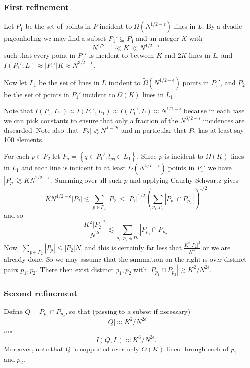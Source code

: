 \documentclass[12pt]{article}
\begin{document}
\subsubsection{First refinement}

Let $P_1$  be the set of points in $P$ incident to $\Omega\left(N^{1/2-\epsilon}\right)$ lines in $L$.
By a dyadic pigeonholing we may find a subset $P_1'\subseteq P_1$ and an integer $K$ with $$N^{1/2- \epsilon}\ll K \ll N^{1/2+\epsilon}$$ such that every point in $P_1'$ is incident to between $K$ and $2K$ lines in $L$, and $I(P_1',L)\approx|P_1'|K \approx N^{3/2-\epsilon}$. 

Now let $L_1$ be the set of lines in $L$ incident to $\widetilde{\Omega}\left(N^{1/2-\epsilon}\right)$ points in $P_1'$, and
 $P_2$ be the set of points in $P_1'$ incident to $\widetilde{\Omega}\left(K\right)$ lines in $L_1$.

Note that $I(P_2,L_1)\approx I(P_1',L_1)\approx I(P_1',L)\approx N^{3/2-\epsilon}$ because in each case we can pick constants to ensure that only a fraction of the $N^{3/2-\epsilon}$ incidences are discarded. Note also that $|P_2|\gtrsim N^{1-2\epsilon}$ and in particular that $P_2$ has at least say 100 elements.

For each $p \in P_2$ let $P_p=\left\{q \in P_1':l_{pq}\in L_1\right\}$. Since $p$ is incident to $\widetilde{\Omega}(K)$ lines in $L_1$ and each line is incident to at least $\widetilde{\Omega}(N^{1/2-\epsilon})$ points in $P_1'$ we have $|P_p|\gtrsim K N^{1/2-\epsilon}$. Summing over all such $p$ and applying Cauchy-Schwartz gives
\begin{equation}\label{eq:CS}
K N^{1/2-\epsilon}|P_2|\lesssim \sum_{p \in P_2}|P_2|
\leq |P_1|^{1/2}\left(\sum_{p_1,p_2}\left|P_{p_1}\cap P_{p_2}\right|\right)^{1/2}
\end{equation}
and so 
$$\frac{K^2 |P_2|^2}{N^{2\epsilon}}  \lesssim \sum_{p_1,p_2 \in P_2}\left|P_{p_1}\cap P_{p_2}\right|$$
Now, $\sum_{p \in P_2}|P_p| \leq |P_2|N$, and this is certainly far less that $\frac{K^2 |P_2|^2}{N^{2\epsilon}}$ or we are already done. So we may assume that the summation on the right is over distinct pairs $p_1,p_2$. There then exist distinct $p_1,p_2$ with $\left|P_{p_1}\cap P_{p_2}\right|\gtrsim K^2/N^{2 \epsilon}$. 

\subsubsection{Second refinement}

Define $Q=P_{p_1}\cap P_{p_2}$, so that (passing to a subset if necessary) $$|Q|\approx K^2/N^{2\epsilon}$$ and $$I(Q,L)\approx K^3/N^{2\epsilon}.$$ Moreover, note that $Q$ is supported over only $O(K)$ lines through each of $p_1$ and $p_2$.
\end{document}
